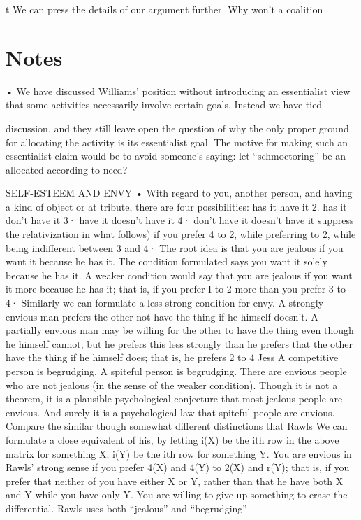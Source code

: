 \documentclass[11pt,openany]{book}
\newcommand{\booknoteshead}{%
  \phantomsection\section*{Notes}%
  \addcontentsline{toc}{section}{Notes}\markright{Notes}}
\begin{document}
t We can press the details of our argument further. Why won't a coalition 

\booknoteshead

{\footnotesize\setlength{\parindent}{0pt}\setlength{\parskip}{5pt}

• We have discussed Williams' position without introducing an essentialist view that some activities necessarily involve certain goals. Instead we have tied\par

discussion, and they still leave open the question of why the only proper ground for allocating the activity is its essentialist goal. The motive for making such an essentialist claim would be to avoid someone's saying: let ``schmoctoring'' be an allocated according to need?\par

SELF-ESTEEM AND ENVY • With regard to you, another person, and having a kind of object or at tribute, there are four possibilities: has it have it 2. has it don't have it 3· have it doesn't have it 4· don't have it doesn't have it suppress the relativization in what follows) if you prefer 4 to 2, while preferring to 2, while being indifferent between 3 and 4· The root idea is that you are jealous if you want it because he has it. The condition formulated says you want it solely because he has it. A weaker condition would say that you are jealous if you want it more because he has it; that is, if you prefer I to 2 more than you prefer 3 to 4· Similarly we can formulate a less strong condition for envy. A strongly envious man prefers the other not have the thing if he himself doesn't. A partially envious man may be willing for the other to have the thing even though he himself cannot, but he prefers this less strongly than he prefers that the other have the thing if he himself does; that is, he prefers 2 to 4 Jess A competitive person is begrudging. A spiteful person is begrudging. There are envious people who are not jealous (in the sense of the weaker condition). Though it is not a theorem, it is a plausible psychological conjecture that most jealous people are envious. And surely it is a psychological law that spiteful people are envious. Compare the similar though somewhat different distinctions that Rawls We can formulate a close equivalent of his, by letting i(X) be the ith row in the above matrix for something X; i(Y) be the ith row for something Y. You are envious in Rawls' strong sense if you prefer 4(X) and 4(Y) to 2(X) and r(Y); that is, if you prefer that neither of you have either X or Y, rather than that he have both X and Y while you have only Y. You are willing to give up something to erase the differential. Rawls uses both ``jealous'' and ``begrudging''\par

}
\end{document}

